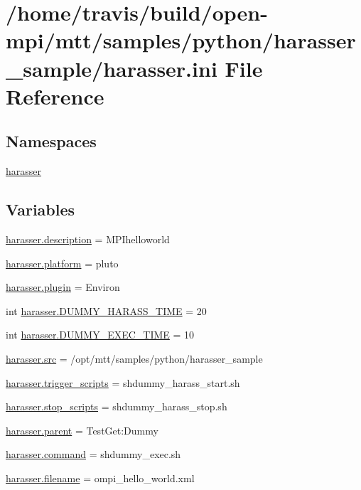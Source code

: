 \hypertarget{harasser_8ini}{\section{/home/travis/build/open-\/mpi/mtt/samples/python/harasser\-\_\-sample/harasser.ini File Reference}
\label{harasser_8ini}
}
\subsection*{Namespaces}
\begin{DoxyCompactItemize}
\item 
\hyperlink{namespaceharasser}{harasser}
\end{DoxyCompactItemize}
\subsection*{Variables}
\begin{DoxyCompactItemize}
\item 
\hyperlink{namespaceharasser_ae9df0d8dd5280b3f68c1594d929d77e9}{harasser.\-description} = M\-P\-Ihelloworld
\item 
\hyperlink{namespaceharasser_aa827937946f071c462edd50adeffbf99}{harasser.\-platform} = pluto
\item 
\hyperlink{namespaceharasser_af41bea3324a7007e30dccbc1526e63b2}{harasser.\-plugin} = Environ
\item 
int \hyperlink{namespaceharasser_a5335f316caefd7dcb9a59e1541f56a10}{harasser.\-D\-U\-M\-M\-Y\-\_\-\-H\-A\-R\-A\-S\-S\-\_\-\-T\-I\-M\-E} = 20
\item 
int \hyperlink{namespaceharasser_a3663429ea3884044eef5813de2c88893}{harasser.\-D\-U\-M\-M\-Y\-\_\-\-E\-X\-E\-C\-\_\-\-T\-I\-M\-E} = 10
\item 
\hyperlink{namespaceharasser_a5cb1fdd5bdc77091984dbf7901fd7e00}{harasser.\-src} = /opt/mtt/samples/python/harasser\-\_\-sample
\item 
\hyperlink{namespaceharasser_aaf0bf1c41f9f803a38db036d20b51461}{harasser.\-trigger\-\_\-scripts} = shdummy\-\_\-harass\-\_\-start.\-sh
\item 
\hyperlink{namespaceharasser_acf2bbc7d9fff08e2232c16a79b0e72f4}{harasser.\-stop\-\_\-scripts} = shdummy\-\_\-harass\-\_\-stop.\-sh
\item 
\hyperlink{namespaceharasser_af9d9d7cb6a6d68880aeec6ccfa16ca23}{harasser.\-parent} = Test\-Get\-:\-Dummy
\item 
\hyperlink{namespaceharasser_a688e3d531b66f0b8013fd72625d9a0b5}{harasser.\-command} = shdummy\-\_\-exec.\-sh
\item 
\hyperlink{namespaceharasser_a8ee1446e84f466e788ff1e2b61666751}{harasser.\-filename} = ompi\-\_\-hello\-\_\-world.\-xml
\end{DoxyCompactItemize}
